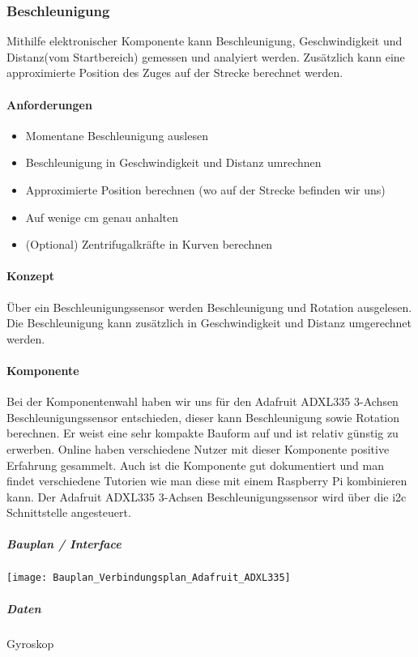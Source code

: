 \documentclass[../..main.tex]{subfiles}
\begin{document}
\subsubsection{Beschleunigung}
Mithilfe elektronischer Komponente kann Beschleunigung, Geschwindigkeit und Distanz(vom Startbereich) gemessen und analyiert werden. Zusätzlich kann eine approximierte Position des Zuges auf der Strecke berechnet werden.

\paragraph{Anforderungen}
\begin{itemize}
    \item Momentane Beschleunigung auslesen
    \item Beschleunigung in Geschwindigkeit und Distanz umrechnen
    \item Approximierte Position berechnen (wo auf der Strecke befinden wir uns)
    \item Auf wenige cm genau anhalten
    \item (Optional) Zentrifugalkräfte in Kurven berechnen
\end{itemize}

\paragraph{Konzept}
Über ein Beschleunigungssensor werden Beschleunigung und Rotation ausgelesen. Die Beschleunigung kann zusätzlich in Geschwindigkeit und Distanz umgerechnet werden.

\paragraph{Komponente}
Bei der Komponentenwahl haben wir uns für den Adafruit ADXL335 3-Achsen Beschleunigungssensor entschieden, dieser kann Beschleunigung sowie Rotation berechnen. Er weist eine sehr kompakte Bauform auf und ist relativ günstig zu erwerben. Online haben verschiedene Nutzer mit dieser Komponente positive Erfahrung gesammelt. Auch ist die Komponente gut dokumentiert und man findet verschiedene Tutorien wie man diese mit einem Raspberry Pi kombinieren kann. Der Adafruit ADXL335 3-Achsen Beschleunigungssensor wird über die i2c Schnittstelle angesteuert.

\subparagraph{Bauplan / Interface}
\texttt{[image: Bauplan\_Verbindungsplan\_Adafruit\_ADXL335]}

\subparagraph{Daten}
Gyroskop
\end{document}

